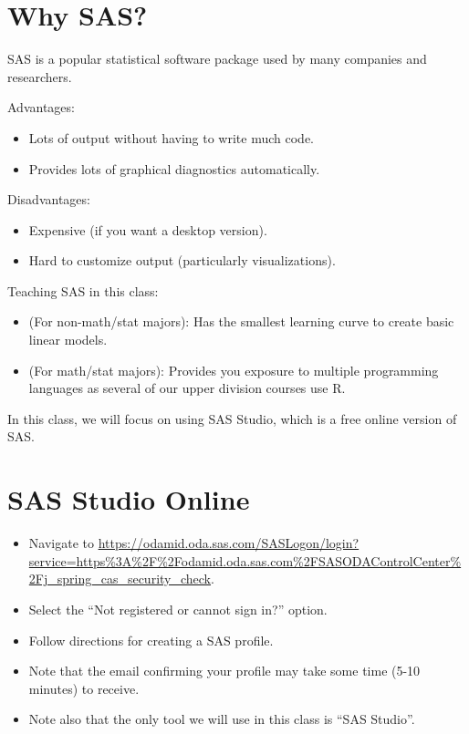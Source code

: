 \documentclass[12pt]{../notes}
\begin{document}

\section{Why SAS?}

SAS is a popular statistical software package used by many companies and researchers. 

\nspace
Advantages:
\begin{itemize}
\item Lots of output without having to write much code. 
\item Provides lots of graphical diagnostics automatically. 
\end{itemize}

\nspace
Disadvantages: 
\begin{itemize}
\item Expensive (if you want a desktop version).
\item Hard to customize output (particularly visualizations). 
\end{itemize}

\nspace
Teaching SAS in this class:
\begin{itemize}
\item (For non-math/stat majors): Has the smallest learning curve to create basic linear models. 
\item (For math/stat majors): Provides you exposure to multiple programming languages as several of our upper division courses use R.
\end{itemize}

In this class, we will focus on using SAS Studio, which is a free online version of SAS. 

\section{SAS Studio Online}
\begin{itemize}
\item Navigate to \url{https://odamid.oda.sas.com/SASLogon/login?service=https%3A%2F%2Fodamid.oda.sas.com%2FSASODAControlCenter%2Fj_spring_cas_security_check}.
\item Select the ``Not registered or cannot sign in?'' option. 
\item Follow directions for creating a SAS profile. 
\item Note that the email confirming your profile may take some time (5-10 minutes) to receive.
\item Note also that the only tool we will use in this class is ``SAS Studio''.
\end{itemize}
\end{document}
